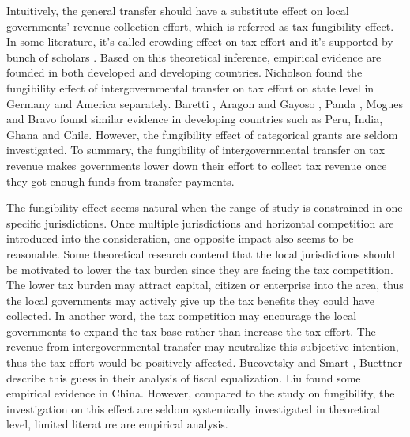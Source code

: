 Intuitively, the general transfer should have a substitute effect on local governments' revenue collection effort, which is referred as tax fungibility effect. In some literature, it's called crowding effect on tax effort and it's supported by bunch of scholars \cite{inman1988federal,peterson1997decentralization,litvack1998rethinking}. Based on this theoretical inference, empirical evidence are founded in both developed and developing countries. Nicholson \cite{nicholson2008fiscal} found the fungibility effect of intergovernmental transfer on tax effort on state level in Germany and America separately. Baretti \cite{2002A}, Aragon and Gayoso \cite{aragon2005intergovernmental}, Panda \cite{panda2009central}, Mogues \cite{mogues2012external} and Bravo \cite{bravo2013income} found similar evidence in developing countries such as Peru, India, Ghana and Chile. However, the fungibility effect of categorical grants are seldom investigated. To summary, the fungibility of intergovernmental transfer on tax revenue makes governments lower down their effort to collect tax revenue once they got enough funds from transfer payments.

The fungibility effect seems natural when the range of study is constrained in one specific jurisdictions. Once multiple jurisdictions and horizontal competition are introduced into the consideration, one opposite impact also seems to be reasonable. Some theoretical research contend that the local jurisdictions should be motivated to lower the tax burden since they are facing the tax competition. The lower tax burden may attract capital, citizen or enterprise into the area, thus the local governments may actively give up the tax benefits they could have collected. In another word, the tax competition may encourage the local governments to expand the tax base rather than increase the tax effort. The revenue from intergovernmental transfer may neutralize this subjective intention, thus the tax effort would be positively affected. Bucovetsky and Smart \cite{2010The}, Buettner \cite{2006The} describe this guess in their analysis of fiscal equalization. Liu \cite{2011Intergovernmental}
found some empirical evidence in China. However, compared to the study on fungibility, the investigation on this effect are seldom systemically investigated in theoretical level, limited literature are empirical analysis.

